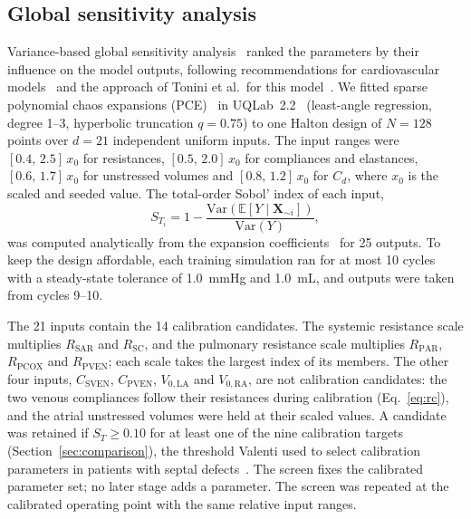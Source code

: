 \subsection{Global sensitivity analysis}
\label{sec:gsa}
Variance-based global sensitivity analysis~\cite{Sobol2001,Saltelli2010} ranked the parameters by their influence on the model outputs, following recommendations for cardiovascular models~\cite{Eck2016} and the approach of Tonini et al.\ for this model~\cite{Tonini2025}. We fitted sparse polynomial chaos expansions (PCE)~\cite{Blatman2011} in UQLab~2.2~\cite{Marelli2014} (least-angle regression, degree 1--3, hyperbolic truncation $q = 0.75$) to one Halton design of $N = 128$ points over $d = 21$ independent uniform inputs. The input ranges were $[0.4,\,2.5]\,x_0$ for resistances, $[0.5,\,2.0]\,x_0$ for compliances and elastances, $[0.6,\,1.7]\,x_0$ for unstressed volumes and $[0.8,\,1.2]\,x_0$ for $C_d$, where $x_0$ is the scaled and seeded value. The total-order Sobol' index of each input,
\begin{equation}
S_{T_i} = 1 - \frac{\mathrm{Var}\!\left(\mathbb{E}\left[Y \mid \mathbf{X}_{\sim i}\right]\right)}{\mathrm{Var}(Y)},
\label{eq:sobol}
\end{equation}
was computed analytically from the expansion coefficients~\cite{Sudret2008} for 25 outputs. To keep the design affordable, each training simulation ran for at most 10 cycles with a steady-state tolerance of 1.0~mmHg and 1.0~mL, and outputs were taken from cycles 9--10.

The 21 inputs contain the 14 calibration candidates. The systemic resistance scale multiplies $R_{\mathrm{SAR}}$ and $R_{\mathrm{SC}}$, and the pulmonary resistance scale multiplies $R_{\mathrm{PAR}}$, $R_{\mathrm{PCOX}}$ and $R_{\mathrm{PVEN}}$; each scale takes the largest index of its members. The other four inputs, $C_{\mathrm{SVEN}}$, $C_{\mathrm{PVEN}}$, $V_{0,\mathrm{LA}}$ and $V_{0,\mathrm{RA}}$, are not calibration candidates: the two venous compliances follow their resistances during calibration (Eq.~\ref{eq:rc}), and the atrial unstressed volumes were held at their scaled values. A candidate was retained if $S_{T} \ge 0.10$ for at least one of the nine calibration targets (Section~\ref{sec:comparison}), the threshold Valenti used to select calibration parameters in patients with septal defects~\cite{Valenti2023}. The screen fixes the calibrated parameter set; no later stage adds a parameter. The screen was repeated at the calibrated operating point with the same relative input ranges.

